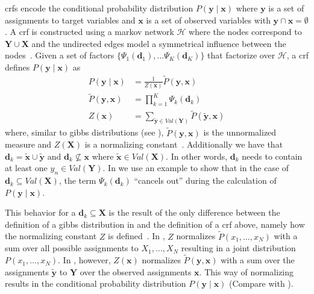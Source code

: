 \bigskip

\Glspl{crf} encode the \gls{conditional probability distribution} $P(\mathbf{y}\mid\mathbf{x})$ where $\mathbf{y}$ is a set of assignments to \glspl{target variable} and $\mathbf{x}$ is a set of \glspl{observed variable} with $\mathbf{y}\cap\mathbf{x}=\emptyset$.
A \gls{crf} is constructed using a \gls{markov network} $\mathcal{H}$ where the nodes correspond to $\mathbf{Y}\cup\mathbf{X}$ and the undirected edges model a symmetrical influence between the nodes~\citep{koller2009probabilistic}.
Given a set of \glspl{factor} $\{\Psi_1(\mathbf{d}_1),\dots\Psi_K(\mathbf{d}_K)\}$ that factorize over $\mathcal{H}$, a \gls{crf} defines $P(\mathbf{y}\mid\mathbf{x})$ as~\citep{koller2009probabilistic}
\begin{equation}
  \label{equ:crf-factor}
  \begin{split}
    P(\mathbf{y}\mid\mathbf{x}) & = \frac{1}{Z(\mathbf{x})}\tilde{P}(\mathbf{y},\mathbf{x}) \\
    \tilde{P}(\mathbf{y},\mathbf{x}) &= \prod_{k=1}^{K}\Psi_k\left(\mathbf{d}_k\right) \\
    Z(\mathbf{x}) & = \sum_{\mathbf{\tilde{y}}\in Val(\mathbf{Y})}\tilde{P}(\mathbf{\tilde{y}},\mathbf{x})
  \end{split}
\end{equation}
where, similar to \glspl{gibbs distribution} (see ), $\tilde{P}(\mathbf{y},\mathbf{x})$ is the unnormalized measure and $Z(\mathbf{X})$ is a normalizing constant~\citep{koller2009probabilistic}.
Additionally we have that $\mathbf{d}_k=\mathbf{\tilde{x}}\cup\mathbf{\tilde{y}}$ and $\mathbf{d}_k\not\subseteq\mathbf{x}$ where $\mathbf{\tilde{x}}\in Val(\mathbf{X})$.
In other words, $\mathbf{d}_k$ needs to contain at least one $y_n\in Val(\mathbf{Y})$.
In  we use an example to show that in the case of $\mathbf{d}_k\subseteq Val(\mathbf{X})$, the term $\Psi_k(\mathbf{d}_k)$ ``cancels out'' during the calculation of $P(\mathbf{y}\mid\mathbf{x})$.

This behavior for a $\mathbf{d}_k\subseteq\mathbf{X}$ is the result of the only difference between the definition of a \gls{gibbs distribution} in  and the definition of a \gls{crf} above, namely how the normalizing constant $Z$ is defined~\citep{koller2009probabilistic}.
In , $Z$ normalizes $\tilde{P}(x_1,\dots,x_N)$ with a sum over all possible assignments to $X_1,\dots,X_N$ resulting in a \gls{joint distribution} $P(x_1,\dots,x_N)$.
In , however, $Z(\mathbf{x})$ normalizes $\tilde{P}(\mathbf{y},\mathbf{x})$ with a sum over the assignments $\mathbf{\tilde{y}}$ to $\mathbf{Y}$ over the observed assignments $\mathbf{x}$.
This way of normalizing results in the \gls{conditional probability distribution} $P(\mathbf{y}\mid\mathbf{x})$ (Compare with ).

